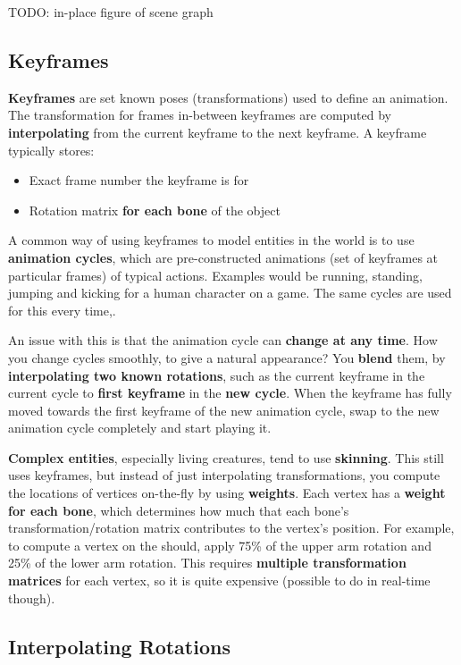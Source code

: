 \documentclass{article}
\begin{document}
TODO: in-place figure of scene graph

\subsection{Keyframes}

\textbf{Keyframes} are set known poses (transformations) used to define an animation. The transformation for frames in-between keyframes are computed by \textbf{interpolating} from the current keyframe to the next keyframe. A keyframe typically stores:
\begin{itemize}
	\item Exact frame number the keyframe is for
	\item Rotation matrix \textbf{for each bone} of the object
\end{itemize}

A common way of using keyframes to model entities in the world is to use \textbf{animation cycles}, which are pre-constructed animations (set of keyframes at particular frames) of typical actions. Examples would be running, standing, jumping and kicking for a human character on a game. The same cycles are used for this every time,.

An issue with this is that the animation cycle can \textbf{change at any time}. How you change cycles smoothly, to give a natural appearance? You \textbf{blend} them, by \textbf{interpolating two known rotations}, such as the current keyframe in the current cycle  to \textbf{first keyframe} in the \textbf{new cycle}. When the keyframe has fully moved towards the first keyframe of the new animation cycle, swap to the new animation cycle completely and start playing it.

\textbf{Complex entities}, especially living creatures, tend to use \textbf{skinning}. This still uses keyframes, but instead of just interpolating transformations, you compute the locations of vertices on-the-fly by using \textbf{weights}. Each vertex has a \textbf{weight for each bone}, which determines how much that each bone's transformation/rotation matrix contributes to the vertex's position. For example, to compute a vertex on the should, apply 75\% of the upper arm rotation and 25\% of the lower arm rotation. This requires \textbf{multiple transformation matrices} for each vertex, so it is quite expensive (possible to do in real-time though).

\subsection{Interpolating Rotations}
\end{document}
